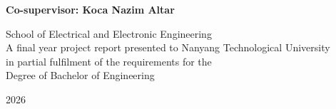 \begin{titlepage}

\begin{center}
    \textbf{Co-supervisor: Koca Nazim Altar}
\end{center}
\vspace{0.5in}
\begin{center}
    {School of Electrical and Electronic Engineering\\
    A final year project report presented to Nanyang Technological University \\
    in partial fulfilment of the requirements for the \\
    Degree of Bachelor of Engineering}
\end{center}

\vspace{0.5in}

\begin{center}
    2026
\end{center}
\end{titlepage}
